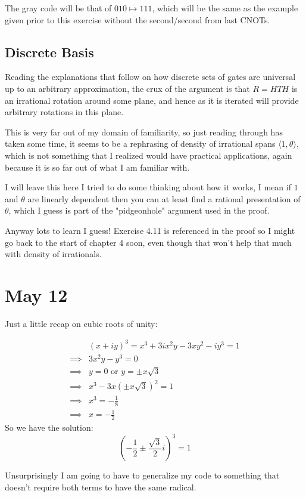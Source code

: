 \documentclass[]{article}
\begin{document}
The gray code will be that of $010 \mapsto 111$, which will be the same as the example given prior to this exercise without the second/second from last CNOTs.

\subsection{Discrete Basis}

Reading the explanations that follow on how discrete sets of gates are universal up to an arbitrary approximation, the crux of the argument is that $R = HTH$ is an irrational rotation around some plane, and hence as it is iterated will provide arbitrary rotations in this plane.

This is very far out of my domain of familiarity, so just reading through has taken some time, it seems to be a rephrasing of density of irrational spans $\langle 1, \theta \rangle$, which is not something that I realized would have practical applications, again because it is so far out of what I am familiar with.

I will leave this here I tried to do some thinking about how it works, I mean if $1$ and $\theta$ are linearly dependent then you can at least find a rational presentation of $\theta$, which I guess is part of the "pidgeonhole" argument used in the proof.

Anyway lots to learn I guess! Exercise 4.11 is referenced in the proof so I might go back to the start of chapter 4 soon, even though that won't help that much with density of irrationals.

\section{May 12}
Just a little recap on cubic roots of unity:

\begin{align*}
&(x+iy)^3 = x^3 + 3ix^2y - 3xy^2 -iy^3 = 1
\\\implies& 3x^2y - y^3 = 0
\\\implies& y = 0 \text{\ or\ } y = \pm x\sqrt{3}
\\\implies& x^3 - 3x(\pm x\sqrt{3})^2 = 1
\\\implies& x^3 = -\frac{1}{8}
\\\implies& x = -\frac{1}{2}
\end{align*}
So we have the solution:
\[\left(-\frac{1}{2} \pm \frac{\sqrt{3}}{2}i\right)^3 = 1\]

Unsurprisingly I am going to have to generalize my code to something that doesn't require both terms to have the same radical.
\end{document}

